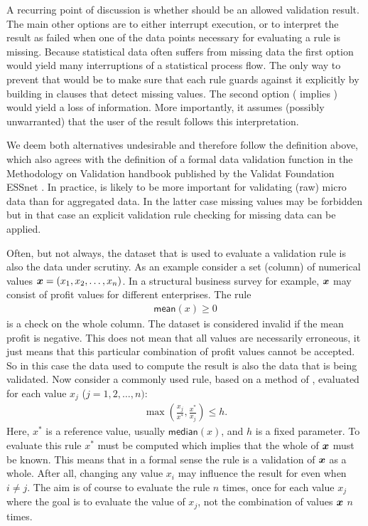 A recurring point of discussion is whether \na{} should be an allowed
validation result. The main other options are to either interrupt execution, or
to interpret the result as failed when one of the data points necessary for
evaluating a rule is missing. Because statistical data often suffers from
missing data the first option would yield many interruptions of a statistical
process flow. The only way to prevent that would be to make sure that each rule
guards against it explicitly by building in clauses that detect missing values.
The second option (\na{} implies \onwaar{}) would yield a loss of information.
More importantly, it assumes (possibly unwarranted) that the user of the result
follows this interpretation.

We deem both alternatives undesirable and therefore follow the definition
above, which also agrees with the definition of a formal data validation
function in the Methodology on Validation handbook published by the Validat
Foundation ESSnet \citep{zio2015methodology}. In practice, \na{} is likely
to be more important for validating (raw) micro data than for aggregated data.
In the latter case missing values may be forbidden but in that case
an explicit validation rule checking for missing data can be applied.

Often, but not always, the dataset that is used to evaluate a validation rule
is also the data under scrutiny. As an example consider a set (column) of
numerical values $\boldsymbol{x}=(x_1,x_2,\ldots,x_n)$. In a structural business survey
for example, $\boldsymbol{x}$ may consist of profit values for different enterprises.
The rule 
\begin{align*}
\textsf{mean}(x) \geq 0
\end{align*}
is a check on the whole column. The dataset is considered invalid if the mean
profit is negative. This does not mean that all values are necessarily
erroneous, it just means that this particular combination of profit values
cannot be accepted. So in this case the data used to compute the result is also
the data that is being validated. Now consider a commonly used rule, based on a
method of \citet{hiridoglou1986statistical}, evaluated for each value $x_j$
($j=1,2,\ldots, n)$:
\begin{align}
\max\left(\frac{x_j}{x^*},\frac{x^*}{x_j}\right) \leq h.
\label{eq:hbfun}
\end{align}
Here, $x^*$ is a reference value, usually $\textsf{median}(x)$, and $h$ is a
fixed parameter. To evaluate this rule $x^*$ must be computed which implies
that the whole of $\boldsymbol{x}$ must be known. This means that in a formal sense the
rule is a validation of $\boldsymbol{x}$ as a whole. After all, changing any value
$x_{i}$ may influence the result for even when $i\not=j$. The aim is of course
to evaluate the rule $n$ times, once for each value $x_j$ where the goal is to
evaluate the value of $x_j$, not the combination of values $\boldsymbol{x}$ $n$ times.

